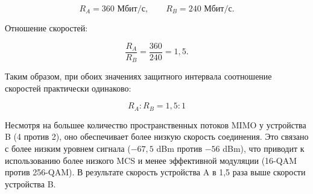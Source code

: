 \[
R_A=360\text{ Мбит/с}, \qquad
R_B=240\text{ Мбит/с}.
\]

Отношение скоростей:

\[
\frac{R_A}{R_B}
=
\frac{360}{240}=1{,}5.
\]

Таким образом, при обоих значениях защитного интервала соотношение
скоростей практически одинаково:

\[
\boxed{R_A:R_B=1{,}5:1}
\]

Несмотря на большее количество пространственных потоков MIMO у устройства B
(4 против 2), оно обеспечивает более низкую скорость соединения.
Это связано с более низким уровнем сигнала ($-67{,}5$ dBm против $-56$ dBm),
что приводит к использованию более низкого MCS и менее эффективной
модуляции (16-QAM против 256-QAM). В результате скорость устройства A
в 1,5 раза выше скорости устройства B.